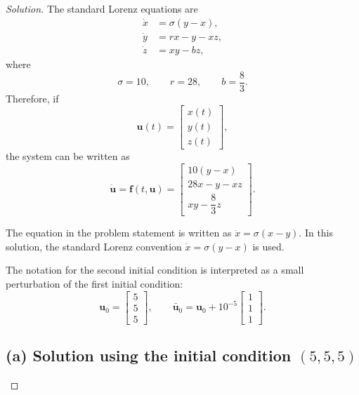 \documentclass[12pt]{amsart}
\newenvironment{solution}
{\begin{proof}[Solution]}
{\end{proof}}
\begin{document}
\begin{onehalfspace}
\begin{solution}
            The standard Lorenz equations are
            \begin{align}
                \dot{x} &= \sigma(y-x), \\
                \dot{y} &= rx-y-xz, \\
                \dot{z} &= xy-bz,
            \end{align}
            where
            \[
                \sigma=10,\qquad r=28,\qquad b=\frac{8}{3}.
            \]
            Therefore, if
            \[
                \mathbf{u}(t)=
                \begin{bmatrix}
                    x(t)\\y(t)\\z(t)
                \end{bmatrix},
            \]
            the system can be written as
            \[
                \dot{\mathbf{u}}=\mathbf{f}(t,\mathbf{u})
                =
                \begin{bmatrix}
                    10(y-x)\\
                    28x-y-xz\\
                    xy-\dfrac{8}{3}z
                \end{bmatrix}.
            \]

            The equation in the problem statement is written as
            $\dot{x}=\sigma(x-y)$. In this solution, the standard Lorenz convention
            $\dot{x}=\sigma(y-x)$ is used.

            The notation for the second initial condition is interpreted as a small
            perturbation of the first initial condition:
            \[
                \mathbf{u}_0=
                \begin{bmatrix}
                    5\\5\\5
                \end{bmatrix},
                \qquad
                \bar{\mathbf{u}}_0
                =
                \mathbf{u}_0+
                10^{-5}
                \begin{bmatrix}
                    1\\1\\1
                \end{bmatrix}.
            \]

            \subsection*{(a) Solution using the initial condition $(5,5,5)$}


\end{solution}
\end{onehalfspace}
\end{document}

